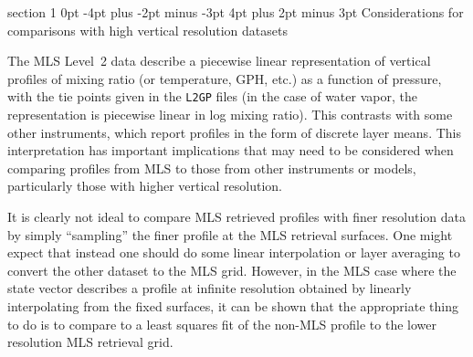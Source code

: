 \documentclass[11pt,draft]{report}
\makeatletter
\renewcommand{\section}{\@startsection%
  {section}%
  {1}%
  {0pt}%
  {-4pt plus -2pt minus -3pt}%
  {4pt plus 2pt minus 3pt}%
  {\Large\sffamily\fontseries{sb}\selectfont\flushleft\color{SectionColor}\figureversion{tabular}}}%
\makeatother
\begin{document}
\section{Considerations for comparisons with high vertical resolution
  datasets}
\label{sec:BasisIssues}

The MLS Level~2 data describe a piecewise linear representation of
vertical profiles of mixing ratio (or temperature, GPH, etc.) as a function of
pressure, with the tie points given in the \texttt{L2GP} files (in the
case of water vapor, the representation is piecewise linear in log
mixing ratio).  This contrasts with some other instruments, which report
profiles in the form of discrete layer means.  This interpretation has
important implications that may need to be considered when comparing
profiles from MLS to those from other instruments or models,
particularly those with higher vertical resolution.

It is clearly not ideal to compare MLS retrieved profiles with finer
resolution data by simply ``sampling'' the finer profile at the MLS
retrieval surfaces.  One might expect that instead one should do some
linear interpolation or layer averaging to convert the other dataset to
the MLS grid.  However, in the MLS case where the state vector describes
a profile at infinite resolution obtained by linearly interpolating from
the fixed surfaces, it can be shown that the appropriate thing to do is
to compare to a least squares fit of the non-MLS profile to the lower
resolution MLS retrieval grid.
\end{document}
